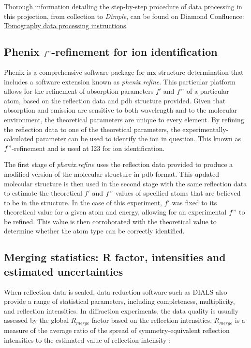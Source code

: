 Thorough information detailing the step-by-step procedure of data processing in this projection, from collection to \textit{Dimple}, can be found on Diamond Confluence: \href{https://confluence.diamond.ac.uk/x/yIWuD}{Tomography data processing instructions}. %

\subsection{Phenix $f"$-refinement for ion identification}

Phenix is a comprehensive software package for \ac{mx} structure determination that includes a software extension known as \textit{phenix.refine}. This particular platform allows for the refinement of absorption parameters $f'$ and $f"$ of a particular atom, based on the reflection data and \ac{pdb} structure provided. Given that absorption and emission are sensitive to both wavelength and to the molecular environment, the theoretical parameters are unique to every element. By refining the reflection data to one of the theoretical parameters, the experimentally-calculated parameter can be used to identify the ion in question. This known as $f"$-refinement and is used at I23 for ion identification.

The first stage of \textit{phenix.refine} uses the reflection data provided to produce a modified version of the molecular structure in \ac{pdb} format. This updated molecular structure is then used in the second stage with the same reflection data to estimate the theoretical $f'$ and $f"$ values of specified atoms that are believed to be in the structure. In the case of this experiment, $f'$ was fixed to its theoretical value for a given atom and energy, allowing for an experimental $f"$ to be refined. This value is then corroborated with the theoretical value to determine whether the atom type can be correctly identified.%

\subsection{Merging statistics: R factor, intensities and estimated uncertainties}

When reflection data is scaled, data reduction software such as DIALS also provide a range of statistical parameters, including completeness, multiplicity, and reflection intensities. In diffraction experiments, the data quality is usually assessed by the global $R_{merge}$ factor based on the reflection intensities. $R_{merge}$ is a measure of the average ratio of the spread of symmetry-equivalent reflection intensities to the estimated value of reflection intensity \cite{Dauter1999}:


